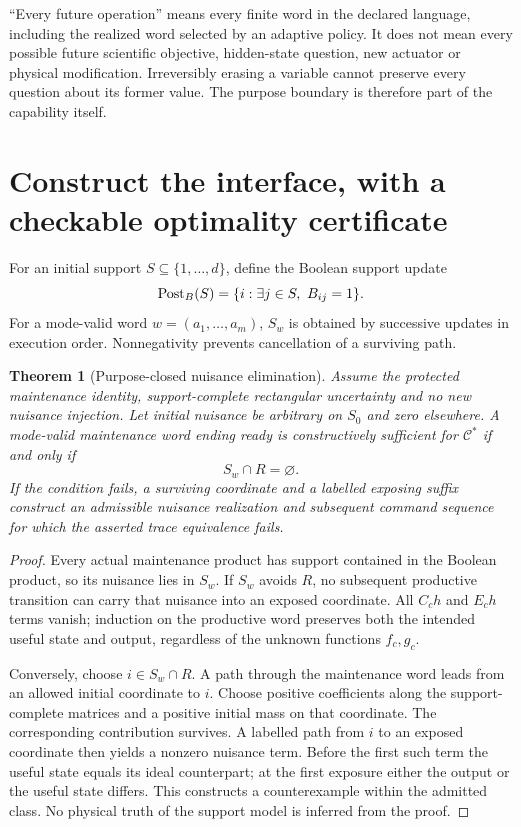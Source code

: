 \documentclass[11pt,letterpaper]{article}
\newtheorem{theorem}{Theorem}[section]
\theoremstyle{definition}\newtheorem{definition}[theorem]{Definition}
\theoremstyle{remark}\newtheorem{remark}[theorem]{Remark}
\begin{document}
``Every future operation'' means every finite word in the declared language, including the realized word selected by an adaptive policy. It does not mean every possible future scientific objective, hidden-state question, new actuator or physical modification. Irreversibly erasing a variable cannot preserve every question about its former value. The purpose boundary is therefore part of the capability itself.

\section{Construct the interface, with a checkable optimality certificate}
\label{sec:structural}
For an initial support $S\subseteq\{1,\ldots,d\}$, define the Boolean support update
\begin{equation}
 \operatorname{Post}_{B}(S)=\{i:\exists j\in S,\ B_{ij}=1\}.
 \label{eq:post}
\end{equation}
For a mode-valid word $w=(a_1,\ldots,a_m)$, $S_w$ is obtained by successive updates in execution order. Nonnegativity prevents cancellation of a surviving path.

\begin{theorem}[Purpose-closed nuisance elimination]
\label{thm:closed}
Assume the protected maintenance identity, support-complete rectangular uncertainty and no new nuisance injection. Let initial nuisance be arbitrary on $S_0$ and zero elsewhere. A mode-valid maintenance word ending ready is constructively sufficient for $\mathcal C^*$ if and only if
\begin{equation}
 S_w\cap R=\varnothing.
 \label{eq:criterion}
\end{equation}
If the condition fails, a surviving coordinate and a labelled exposing suffix construct an admissible nuisance realization and subsequent command sequence for which the asserted trace equivalence fails.
\end{theorem}
\begin{proof}
Every actual maintenance product has support contained in the Boolean product, so its nuisance lies in $S_w$. If $S_w$ avoids $R$, no subsequent productive transition can carry that nuisance into an exposed coordinate. All $C_ch$ and $E_ch$ terms vanish; induction on the productive word preserves both the intended useful state and output, regardless of the unknown functions $f_c,g_c$.

Conversely, choose $i\in S_w\cap R$. A path through the maintenance word leads from an allowed initial coordinate to $i$. Choose positive coefficients along the support-complete matrices and a positive initial mass on that coordinate. The corresponding contribution survives. A labelled path from $i$ to an exposed coordinate then yields a nonzero nuisance term. Before the first such term the useful state equals its ideal counterpart; at the first exposure either the output or the useful state differs. This constructs a counterexample within the admitted class. No physical truth of the support model is inferred from the proof.
\end{proof}
\end{document}
